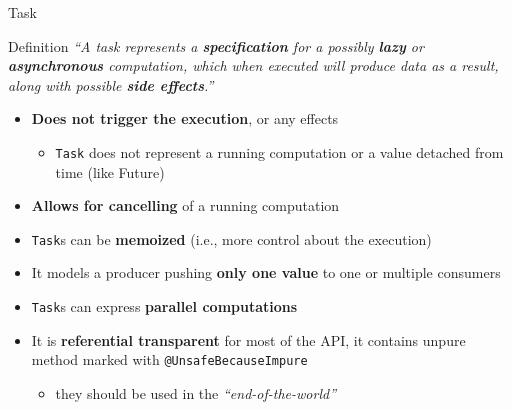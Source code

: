 \documentclass[presentation, 9pt]{beamer}\mode<presentation>{\usetheme{AMSBolognaFC}}
\begin{document}
\begin{frame}{Task \href{https://monix.io/docs/current/eval/task.html}{\faLink}}
	\begin{alertblock}{Definition}
		\emph{``A task represents a \textbf{specification} for a possibly \textbf{lazy} or \textbf{asynchronous} computation, which when executed will produce data as a result, along with possible \textbf{side effects}.''}
	\end{alertblock}
	\begin{itemize}
	\item \textbf{Does not trigger the execution}, or any effects 
		\begin{itemize}
			\item \texttt{Task} does not represent a running computation or a value detached from time (like Future)
		\end{itemize}
	\item \textbf{Allows for cancelling} of a running computation
	\item \texttt{Task}s can be \textbf{memoized} (i.e., more control about the execution)
	\item It models a producer pushing \textbf{only one value} to one or multiple consumers
	\item \texttt{Task}s can express \textbf{parallel computations}
	\item It is \textbf{referential transparent} for most of the API, it contains unpure method marked with \texttt{@UnsafeBecauseImpure}
    \begin{itemize}
			\item they should be used in the \emph{``end-of-the-world''} %
		\end{itemize}
	\end{itemize}
\end{frame}
\end{document}
